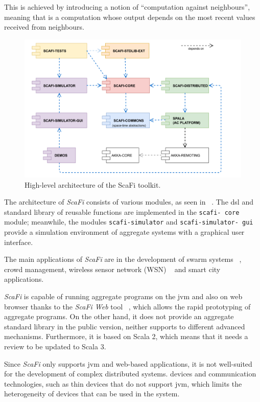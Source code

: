 This is achieved by introducing a notion of ``computation against neighbours'', meaning that is a computation whose
output depends on the most recent values received from neighbours.

\begin{figure}
    \centering
    \includegraphics[width=.7\linewidth]{figures/scafi-structure}
    \caption{High-level architecture of the ScaFi toolkit.}
    \label{fig:scafi-structure}
\end{figure}

The architecture of \emph{ScaFi} consists of various modules, as seen in ~.
The \ac{dsl} and standard library of reusable functions are implemented in the \texttt{scafi-
core} module; meanwhile, the modules \texttt{scafi-simulator} and \texttt{scafi-simulator-
gui} provide a simulation
environment of aggregate systems with a graphical user interface.

The main applications of \emph{ScaFi} are in the development of swarm systems ~\cite{10336236}, crowd management, wireless sensor network (WSN) ~\cite{9935036}
and smart city applications.

\emph{ScaFi} is capable of running aggregate programs on the \ac{jvm} and also on web browser thanks
to the \emph{ScaFi Web} tool ~\cite{10.1007/978-3-030-78142-2_18}, which allows the rapid prototyping of aggregate programs.
On the other hand, it does not provide an aggregate standard library in the public version, neither supports to
different advanced mechanisms.
Furthermore, it is based on Scala 2, which means that it needs a review to be updated to Scala 3.

Since \emph{ScaFi} only supports \ac{jvm} and web-based applications, it is not well-suited for the development of complex distributed systems.
devices and communication technologies, such as thin devices that do not support \ac{jvm}, which limits the heterogeneity of
devices that can be used in the system.

